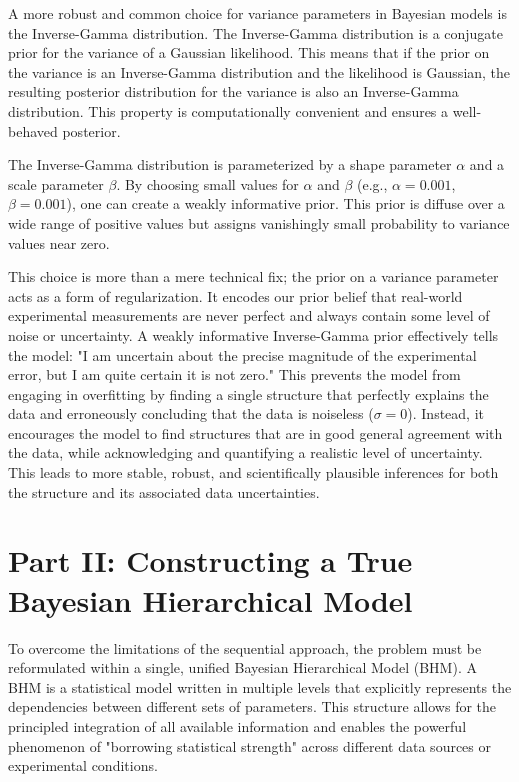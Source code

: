 \documentclass{article}
\begin{document}
A more robust and common choice for variance parameters in Bayesian models is the Inverse-Gamma distribution.\cite{ref10} The Inverse-Gamma distribution is a conjugate prior for the variance of a Gaussian likelihood. This means that if the prior on the variance is an Inverse-Gamma distribution and the likelihood is Gaussian, the resulting posterior distribution for the variance is also an Inverse-Gamma distribution.\cite{ref10} This property is computationally convenient and ensures a well-behaved posterior.

The Inverse-Gamma distribution is parameterized by a shape parameter $\alpha$ and a scale parameter $\beta$. By choosing small values for $\alpha$ and $\beta$ (e.g., $\alpha = 0.001$, $\beta = 0.001$), one can create a weakly informative prior.\cite{ref10} This prior is diffuse over a wide range of positive values but assigns vanishingly small probability to variance values near zero.

This choice is more than a mere technical fix; the prior on a variance parameter acts as a form of regularization. It encodes our prior belief that real-world experimental measurements are never perfect and always contain some level of noise or uncertainty. A weakly informative Inverse-Gamma prior effectively tells the model: "I am uncertain about the precise magnitude of the experimental error, but I am quite certain it is not zero." This prevents the model from engaging in overfitting by finding a single structure that perfectly explains the data and erroneously concluding that the data is noiseless ($\sigma = 0$). Instead, it encourages the model to find structures that are in good general agreement with the data, while acknowledging and quantifying a realistic level of uncertainty. This leads to more stable, robust, and scientifically plausible inferences for both the structure and its associated data uncertainties.

\section{Part II: Constructing a True Bayesian Hierarchical Model}

To overcome the limitations of the sequential approach, the problem must be reformulated within a single, unified Bayesian Hierarchical Model (BHM). A BHM is a statistical model written in multiple levels that explicitly represents the dependencies between different sets of parameters.\cite{ref14} This structure allows for the principled integration of all available information and enables the powerful phenomenon of "borrowing statistical strength" across different data sources or experimental conditions.\cite{ref7}
\end{document}
